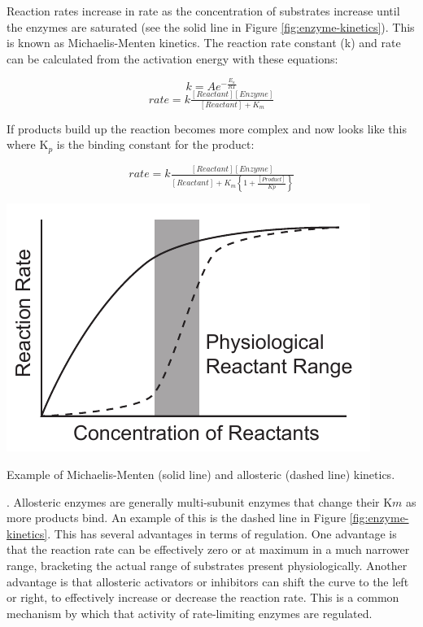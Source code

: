 \documentclass{tufte-handout}
\begin{document}
Reaction rates increase in rate as the concentration of substrates increase until the enzymes are saturated (see the solid line in Figure \ref{fig:enzyme-kinetics}).  This is known as Michaelis-Menten kinetics.  The reaction rate constant (k) and rate can be calculated from the activation energy with these equations:

\begin{equation}
k = A e^{-\frac{E_{a}}{RT}} 
\end{equation}
\begin{equation}
rate = k\tfrac{[Reactant][Enzyme]}{[Reactant] + K_{m}}
\end{equation}

If products build up the reaction becomes more complex and now looks like this where K$_{p}$ is the binding constant for the product:

\begin{equation}
rate = k\tfrac{[Reactant][Enzyme]}{[Reactant] +K_{m}\left \{ 1 + \frac{[Product]}{Kp} \right \}}
\end{equation}

\begin{marginfigure}
\includegraphics[width=\marginparwidth]{figures/enzyme-kinetics.pdf}\
\caption{Example of Michaelis-Menten (solid line) and allosteric (dashed line) kinetics.}
\label{fig:enzyme-kinetics}
\end{marginfigure}

.  Allosteric enzymes are generally multi-subunit enzymes that change their K${m}$ as more products bind.  An example of this is the dashed line in Figure \ref{fig:enzyme-kinetics}.  This has several advantages in terms of regulation.  One advantage is that the reaction rate can be effectively zero or at maximum in a much narrower range, bracketing the actual range of substrates present physiologically.  Another advantage is that allosteric activators or inhibitors can shift the curve to the left or right, to effectively increase or decrease the reaction rate.  This is a common mechanism by which that activity of rate-limiting enzymes are regulated.
\end{document}
